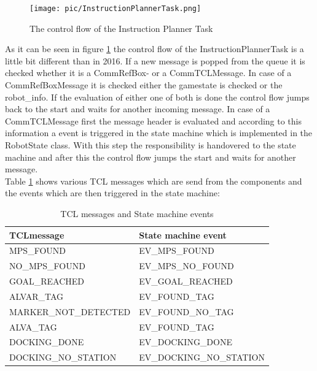 \begin{figure}[h]
\centering
\texttt{[image: pic/InstructionPlannerTask.png]}
\caption{The control flow of the Instruction Planner Task}
\label{fig:instructionplannertask}
\end{figure}
 
As it can be seen in figure \ref{fig:instructionplannertask} the control flow of the InstructionPlannerTask is a little bit different than in 2016. If a new message is popped from the queue it is checked whether it is a CommRefBox- or a CommTCLMessage. In case of a CommRefBoxMessage it is checked either the gamestate is checked or the robot\_info. If the evaluation of either one of both is done the control flow jumps back to the start and waits for another incoming message. In case of a CommTCLMessage first the message header is evaluated and according to this information a event is triggered in the state machine which is implemented in the RobotState class. With this step the responsibility is handovered to the state machine and after this the control flow jumps the start and waits for another message. \\ 

Table \ref{tab:tcl_state} shows various TCL messages which are send from the components and the events which are then triggered in the state machine: \\

\begin {table}[h]
\caption{TCL messages and State machine events}
\label{tab:tcl_state}
\begin{center}

\begin{tabular}{|l|l|}
\hline 
TCLmessage & State machine event \\ 
\hline 
MPS\_FOUND & EV\_MPS\_FOUND \\ 
\hline 
NO\_MPS\_FOUND & EV\_MPS\_NO\_FOUND \\ 
\hline 
GOAL\_REACHED & EV\_GOAL\_REACHED\\ 
\hline 
ALVAR\_TAG & EV\_FOUND\_TAG \\ 
\hline 
MARKER\_NOT\_DETECTED & EV\_FOUND\_NO\_TAG \\ 
\hline 
ALVA\_TAG & EV\_FOUND\_TAG \\ 
\hline 
DOCKING\_DONE & EV\_DOCKING\_DONE \\ 
\hline 
DOCKING\_NO\_STATION & EV\_DOCKING\_NO\_STATION \\ 
\hline 
\end{tabular} 
\end{center}
\end {table}

